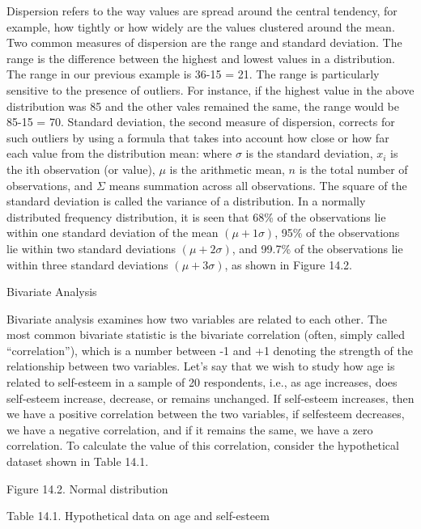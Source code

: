 Dispersion refers to the way values are spread around the central tendency, for example, how tightly or how widely are the values clustered around the mean. Two common measures of dispersion are the range and standard deviation. The range is the difference between the highest and lowest values in a distribution. The range in our previous example is 36-15 = 21. The range is particularly sensitive to the presence of outliers. For instance, if the highest value in the above distribution was 85 and the other vales remained the same, the range would be 85-15 = 70. Standard deviation, the second measure of dispersion, corrects for such outliers by using a formula that takes into account how close or how far each value from the distribution mean: where $\sigma $ is the standard deviation, $ x_i $ is the ith observation (or value), $ \mu $ is the arithmetic mean, $ n $ is the total number of observations, and $ \Sigma $ means summation across all observations. The square of the standard deviation is called the variance of a distribution. In a normally distributed frequency distribution, it is seen that 68\% of the observations lie within one standard deviation of the mean $ (\mu + 1 \sigma) $, 95\% of the observations lie within two standard deviations $ (\mu + 2 \sigma) $, and 99.7\% of the observations lie within three standard deviations $ (\mu + 3 \sigma) $, as shown in Figure 14.2.

Bivariate Analysis

Bivariate analysis examines how two variables are related to each other. The most common bivariate statistic is the bivariate correlation (often, simply called “correlation”), which is a number between -1 and +1 denoting the strength of the relationship between two variables. Let’s say that we wish to study how age is related to self-esteem in a sample of 20 respondents, i.e., as age increases, does self-esteem increase, decrease, or remains unchanged. If self-esteem increases, then we have a positive correlation between the two variables, if selfesteem decreases, we have a negative correlation, and if it remains the same, we have a zero correlation. To calculate the value of this correlation, consider the hypothetical dataset shown in Table 14.1.

Figure 14.2. Normal distribution

Table 14.1. Hypothetical data on age and self-esteem

